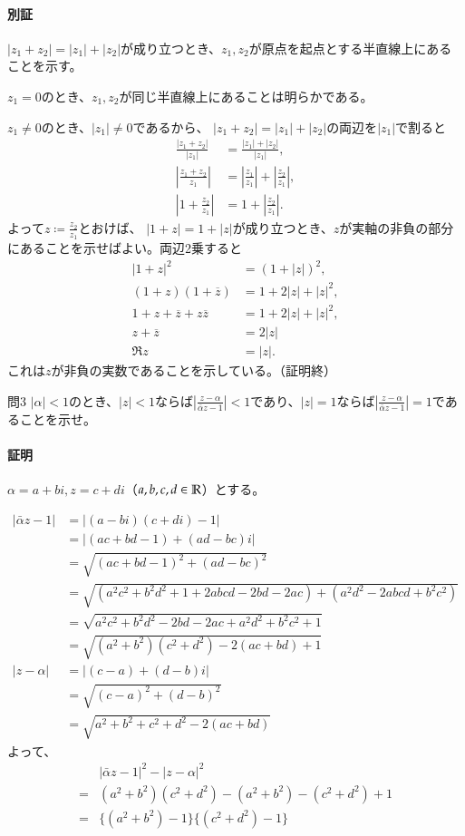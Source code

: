 \paragraph{別証}
$|z_1+z_2|=|z_1|+|z_2|$が成り立つとき、$z_1, z_2$が原点を起点とする半直線上にあることを示す。

$z_1=0$のとき、$z_1, z_2$が同じ半直線上にあることは明らかである。

$z_1\neq 0$のとき、$|z_1|\neq 0$であるから、
$|z_1+z_2|=|z_1|+|z_2|$の両辺を$|z_1|$で割ると
\begin{align*}
    \frac{|z_1+z_2|}{|z_1|}
    &=\frac{|z_1|+|z_2|}{|z_1|},\\
    \left|\frac{z_1+z_2}{z_1}\right|
    &=\left|\frac{z_1}{z_1}\right|
    +\left|\frac{z_2}{z_1}\right|,\\
    \left|1+\frac{z_2}{z_1}\right|
    &=1
    +\left|\frac{z_2}{z_1}\right|.
\end{align*}
よって$z\coloneqq \frac{z_2}{z_1}$とおけば、
$|1+z|=1+|z|$が成り立つとき、$z$が実軸の非負の部分にあることを示せばよい。両辺2乗すると
\begin{align*}
    |1+z|^2&=(1+|z|)^2,\\
    (1+z)(1+\overline{z})&=1+2|z|+|z|^2,\\
    1+z+\overline{z}+z\overline{z}&=1+2|z|+|z|^2,\\
    z+\overline{z}&=2|z|\\
    \Re z&=|z|.
\end{align*}
これは$z$が非負の実数であることを示している。（証明終）

\begin{mysimplebox}{問3}
    $|\alpha|<1$のとき、$|z|<1$ならば$\left|\frac{z-\alpha}{\bar{\alpha}z-1}\right|<1$であり、$|z|=1$ならば$\left|\frac{z-\alpha}{\bar{\alpha}z-1}\right|=1$であることを示せ。
\end{mysimplebox}
\paragraph{証明}
$\alpha=a+bi, z=c+di$（$a,b,c,d\in\mathbb{R}$）とする。

\begin{align*}
    |\bar{\alpha}z-1|&=|(a-bi)(c+di)-1|\\
    &=|(ac+bd-1)+(ad-bc)i|\\
    &=\sqrt{(ac+bd-1)^2+(ad-bc)^2}\\
    &=\sqrt{(a^2c^2+b^2d^2+1+2abcd-2bd-2ac)+(a^2d^2-2abcd+b^2c^2)}\\
    &=\sqrt{a^2c^2+b^2d^2-2bd-2ac+a^2d^2+b^2c^2+1}\\
    &=\sqrt{(a^2+b^2)(c^2+d^2)-2(ac+bd)+1}\\
    |z-\alpha|&=|(c-a)+(d-b)i|\\
    &=\sqrt{(c-a)^2+(d-b)^2}\\
    &=\sqrt{a^2+b^2+c^2+d^2-2(ac+bd)}
\end{align*}
よって、
\begin{align*}
    &|\bar{\alpha}z-1|^2-|z-\alpha|^2\\
    =&(a^2+b^2)(c^2+d^2)-(a^2+b^2)-(c^2+d^2)+1\\
    =&\{(a^2+b^2)-1\}\{(c^2+d^2)-1\}
\end{align*}

